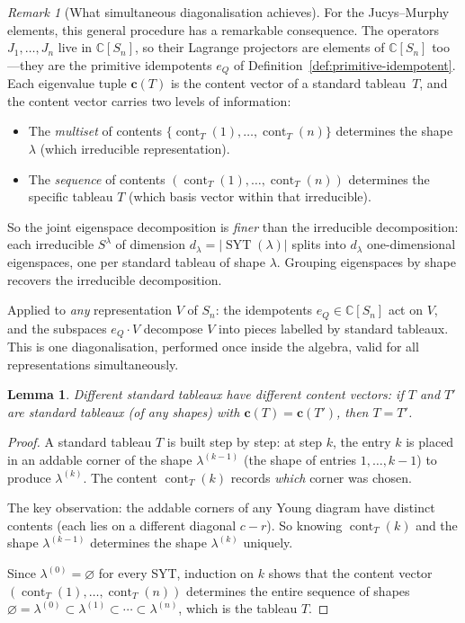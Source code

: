 \documentclass[12pt,a4paper]{article}
\newtheorem{lemma}[theorem]{Lemma}
\theoremstyle{definition}
\theoremstyle{remark}
\newtheorem{remark}[theorem]{Remark}
\newcommand{\C}{\mathbb{C}}
\newcommand{\SYT}{\operatorname{SYT}}
\newcommand{\cont}{\operatorname{cont}}
\begin{document}
\begin{remark}[What simultaneous diagonalisation achieves]
For the Jucys--Murphy elements, this general procedure has a
remarkable consequence. The operators $J_1, \ldots, J_n$ live in
$\C[S_n]$, so their Lagrange projectors are elements of $\C[S_n]$
too---they are the primitive idempotents $e_Q$ of
Definition~\ref{def:primitive-idempotent}. Each eigenvalue tuple
$\mathbf{c}(T)$ is the content vector of a standard tableau~$T$,
and the content vector carries two levels of information:
\begin{itemize}
\item The \emph{multiset} of contents
  $\{\cont_T(1), \ldots, \cont_T(n)\}$ determines the shape
  $\lambda$ (which irreducible representation).
\item The \emph{sequence} of contents
  $(\cont_T(1), \ldots, \cont_T(n))$ determines the specific
  tableau $T$ (which basis vector within that irreducible).
\end{itemize}
So the joint eigenspace decomposition is \emph{finer} than the
irreducible decomposition: each irreducible $S^\lambda$ of
dimension $d_\lambda = |\SYT(\lambda)|$ splits into $d_\lambda$
one-dimensional eigenspaces, one per standard tableau of shape
$\lambda$. Grouping eigenspaces by shape recovers the
irreducible decomposition.

Applied to \emph{any} representation $V$ of $S_n$: the
idempotents $e_Q \in \C[S_n]$ act on $V$, and the subspaces
$e_Q \cdot V$ decompose $V$ into pieces labelled by standard
tableaux. This is one diagonalisation, performed once inside the
algebra, valid for all representations simultaneously.
\end{remark}

\begin{lemma}\label{lem:content-separates}
Different standard tableaux have different content vectors: if $T$
and $T'$ are standard tableaux (of any shapes) with
$\mathbf{c}(T) = \mathbf{c}(T')$, then $T = T'$.
\end{lemma}

\begin{proof}
A standard tableau $T$ is built step by step: at step $k$, the entry
$k$ is placed in an addable corner of the shape $\lambda^{(k-1)}$
(the shape of entries $1, \ldots, k{-}1$) to produce
$\lambda^{(k)}$. The content $\cont_T(k)$ records
\emph{which} corner was chosen.

The key observation: the addable corners of any Young diagram have
distinct contents (each lies on a different diagonal $c - r$). So
knowing $\cont_T(k)$ and the shape $\lambda^{(k-1)}$ determines the
shape $\lambda^{(k)}$ uniquely.

Since $\lambda^{(0)} = \varnothing$ for every SYT, induction on $k$
shows that the content vector $(\cont_T(1), \ldots, \cont_T(n))$
determines the entire sequence of shapes
$\varnothing = \lambda^{(0)} \subset \lambda^{(1)} \subset \cdots
\subset \lambda^{(n)}$, which is the tableau $T$.
\end{proof}
\end{document}
